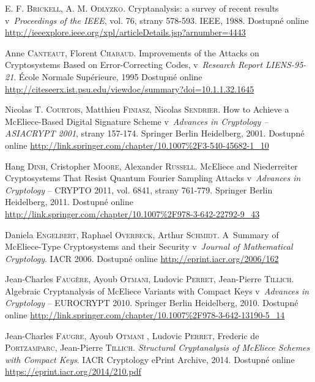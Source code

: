 \documentclass[thesis=M,czech,hidelinks]{FITthesis}[2012/06/26]
\newcommand{\0}{{\textcolor[gray]{0.75}{0}}}
\begin{document}
\begin{thebibliography}{99}
        E. F. \textsc{Brickell}, A. M. \textsc{Odlyzko}. Cryptanalysis: a survey
        of recent results v~\emph{Proceedings of the IEEE}, vol. 76, strany
        578-593. IEEE, 1988. Dostupné online
        \url{http://ieeexplore.ieee.org/xpl/articleDetails.jsp?arnumber=4443}

        Anne \textsc{Canteaut}, Florent \textsc{Chabaud}. Improvements of
        the Attacks on Cryptosystems Based on Error-Correcting Codes,
        v~\emph{Research Report LIENS-95-21}. École Normale Supérieure, 1995
        Dostupné online
        \url{http://citeseerx.ist.psu.edu/viewdoc/summary?doi=10.1.1.32.1645}

        Nicolas T. \textsc{Courtois}, Matthieu \textsc{Finiasz}, Nicolas
        \textsc{Sendrier}. How to Achieve a McEliece-Based Digital Signature
        Scheme v~\emph{Advances in Cryptology -- ASIACRYPT 2001}, strany
        157-174. Springer Berlin Heidelberg, 2001. Dostupné online
        \url{http://link.springer.com/chapter/10.1007\%2F3-540-45682-1\_10}

        Hang \textsc{Dinh}, Cristopher \textsc{Moore}, Alexander
        \textsc{Russell}. McEliece and Niederreiter Cryptosystems That Resist
        Quantum Fourier Sampling Attacks v~\emph{Advances in Cryptology} --
        CRYPTO 2011, vol. 6841, strany 761-779. Springer Berlin Heidelberg,
        2011. Dostupné online
        \url{http://link.springer.com/chapter/10.1007\%2F978-3-642-22792-9\_43}

        Daniela \textsc{Engelbert}, Raphael \textsc{Overbeck}, Arthur
        \textsc{Schmidt}. A~Summary of McEliece-Type Cryptosystems and their
        Security v~\emph{Journal of Mathematical Cryptology}. IACR 2006.
        Dostupné online \url{http://eprint.iacr.org/2006/162}

        Jean-Charles \textsc{Faugère}, Ayoub \textsc{Otmani}, Ludovic
        \textsc{Perret}, Jean-Pierre \textsc{Tillich}. Algebraic Cryptanalysis
        of McEliece Variants with Compact Keys v~\emph{Advances in Cryptology}
        -- EUROCRYPT 2010. Springer Berlin Heidelberg, 2010. Dostupné online
        \url{http://link.springer.com/chapter/10.1007\%2F978-3-642-13190-5\_14}

        Jean-Charles \textsc{Faugre}, Ayoub \textsc{Otmani} , Ludovic
        \textsc{Perret}, Frederic de \textsc{Portzamparc}, Jean-Pierre
        \textsc{Tillich}. \emph{Structural Cryptanalysis of McEliece Schemes
        with Compact Keys}. IACR Cryptology ePrint Archive, 2014. Dostupné
        online \url{https://eprint.iacr.org/2014/210.pdf}


\end{thebibliography}
\end{document}
